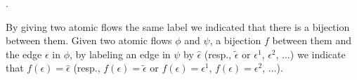 

.


\begin{definition}\label{definition:LabelsIsomorphicFlows}
By giving two atomic flows the same label we indicated that there is a bijection between them.
Given two atomic flows $\phi$ and $\psi$, a bijection $f$ between them and the edge $\epsilon$ in $\phi$, by labeling an edge in $\psi$ by $\hat\epsilon$ (resp., $\tilde\epsilon$ or $\epsilon^1$, $\epsilon^2$, $\dots$) we indicate that $f(\epsilon)=\hat\epsilon$ (resp., $f(\epsilon)=\tilde\epsilon$ or $f(\epsilon)=\epsilon^1$, $f(\epsilon)=\epsilon^2$, $\dots$).
\end{definition}

